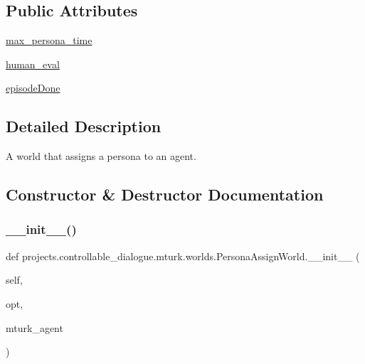 \subsection*{Public Attributes}
\begin{DoxyCompactItemize}
\item 
\hyperlink{classprojects_1_1controllable__dialogue_1_1mturk_1_1worlds_1_1PersonaAssignWorld_a875349c4ad910d85489934e5cc3f4286}{max\+\_\+persona\+\_\+time}
\item 
\hyperlink{classprojects_1_1controllable__dialogue_1_1mturk_1_1worlds_1_1PersonaAssignWorld_abe2ba6a74f6a5c747cffcd62a0db5cb2}{human\+\_\+eval}
\item 
\hyperlink{classprojects_1_1controllable__dialogue_1_1mturk_1_1worlds_1_1PersonaAssignWorld_a4820af5d7a4d448167b669d2b9a1a0ac}{episode\+Done}
\end{DoxyCompactItemize}


\subsection{Detailed Description}
\begin{DoxyVerb}A world that assigns a persona to an agent.
\end{DoxyVerb}
 

\subsection{Constructor \& Destructor Documentation}
\mbox{\label{classprojects_1_1controllable__dialogue_1_1mturk_1_1worlds_1_1PersonaAssignWorld_a5a4e7ec8f20094ed50f4301233be7ae4}} 
\subsubsection{\texorpdfstring{\+\_\+\+\_\+init\+\_\+\+\_\+()}{\_\_init\_\_()}}
{\footnotesize\ttfamily def projects.\+controllable\+\_\+dialogue.\+mturk.\+worlds.\+Persona\+Assign\+World.\+\_\+\+\_\+init\+\_\+\+\_\+ (\begin{DoxyParamCaption}\item[{}]{self,  }\item[{}]{opt,  }\item[{}]{mturk\+\_\+agent }\end{DoxyParamCaption})}



